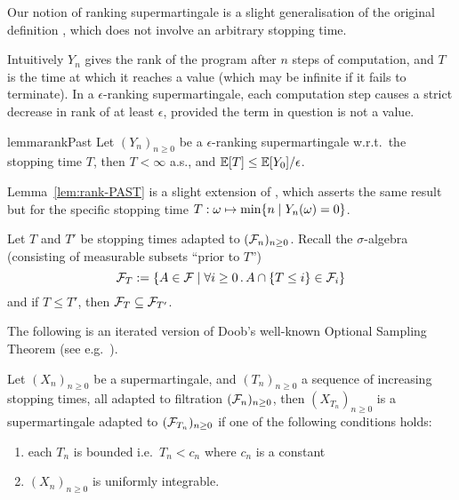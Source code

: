 \begin{remark}
Our notion of ranking supermartingale is a slight generalisation of the original definition \citep{DBLP:conf/cav/ChakarovS13,DBLP:conf/popl/FioritiH15}, which does not involve an arbitrary stopping time.
\end{remark}

Intuitively $Y_n$ gives the rank of the program after $n$ steps of computation, and $T$ is the time at which it reaches a value (which may be infinite if it fails to terminate).
In a $\epsilon$-ranking supermartingale, each computation step causes a strict decrease in rank of at least $\epsilon$, provided the term in question is not a value.

\begin{restatable}{lemma}{rankPast}
\label{lem:rank-PAST}
Let $(Y_n)_{n \geq 0}$ be a $\epsilon$-ranking supermartingale w.r.t.~the stopping time $T$, then $T < \infty$ a.s., and %
$\mathbb{E}[T] \leq {\mathbb{E}[Y_0]}/{\epsilon}$.
\end{restatable}

\begin{remark}
Lemma~\ref{lem:rank-PAST} is a slight extension of \cite[Lem.~5.5]{DBLP:conf/popl/FioritiH15},
which asserts the same result but for the specific stopping time $T : \omega \mapsto \min\{n \mid Y_n(\omega) = 0\}$.
\end{remark}

Let $T$ and $T'$ be stopping times adapted to $(\mathcal{F}_n)_{n \geq 0}$.
Recall the $\sigma$-algebra (consisting of measurable subsets ``prior to $T$'')
\[
\mathcal{F}_T := \{A \in \mathcal{F} \mid \forall i \geq 0 \, . \, A \cap \{T \leq i\} \in \mathcal{F}_i\}
\]
and if $T \leq T'$, then $\mathcal{F}_{T} \subseteq \mathcal{F}_{T'}$.

The following is an iterated version of Doob's well-known Optional Sampling Theorem 
(see e.g.~\citep{AshDD00,DBLP:conf/popl/FioritiH15}).
\begin{therm}
\label{thm:optional sampling}
Let $(X_n)_{n \geq 0}$ be a supermartingale, and $(T_n)_{n \geq 0}$ a sequence of increasing stopping times, all adapted to filtration $(\mathcal{F}_n)_{n \geq 0}$, then $(X_{T_n})_{n \geq 0}$ is a supermartingale adapted to $(\mathcal{F}_{T_n})_{n \geq 0}$ if one of the following conditions holds:
\begin{enumerate}
\item each $T_n$ is bounded i.e.~$T_n < c_n$ where $c_n$ is a constant
\item $(X_n)_{n \geq 0}$ is uniformly integrable.
\end{enumerate}
\end{therm}

